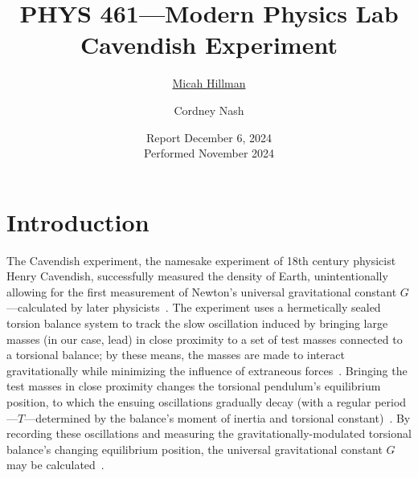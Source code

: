 \documentclass[12pt]{report}
\title{\small{PHYS 461—Modern Physics Lab} \\ \huge{\textbf{Cavendish Experiment}} \\\vspace{-0.6cm}}
\date{
    \small{Report December 6, 2024 \\\vspace{0.05cm}
    Performed November 2024}
}
\author{
    \ul{Micah Hillman} \and Cordney Nash
}
\begin{document}
\maketitle

\section*{Introduction}
{
    The Cavendish experiment, the namesake experiment of 18th century physicist Henry Cavendish, successfully measured the density of Earth, unintentionally allowing for the first measurement of Newton's universal gravitational constant \(G\)—calculated by later physicists~\cite{APS2008}. 
    The experiment uses a hermetically sealed torsion balance system to track the slow oscillation induced by bringing large masses (in our case, lead) in close proximity to a set of test masses connected to a torsional balance; by these means, the masses are made to interact gravitationally while minimizing the influence of extraneous forces~\cite{BMS2024}. 
    Bringing the test masses in close proximity changes the torsional pendulum's equilibrium position, to which the ensuing oscillations gradually decay (with a regular period—\(T\)—determined by the balance's moment of inertia and torsional constant)~\cite{BMS2024}. 
    By recording these oscillations and measuring the gravitationally-modulated torsional balance's changing equilibrium position, the universal gravitational constant \(G\) may be calculated~\cite{BMS2024}.
}
\end{document}
